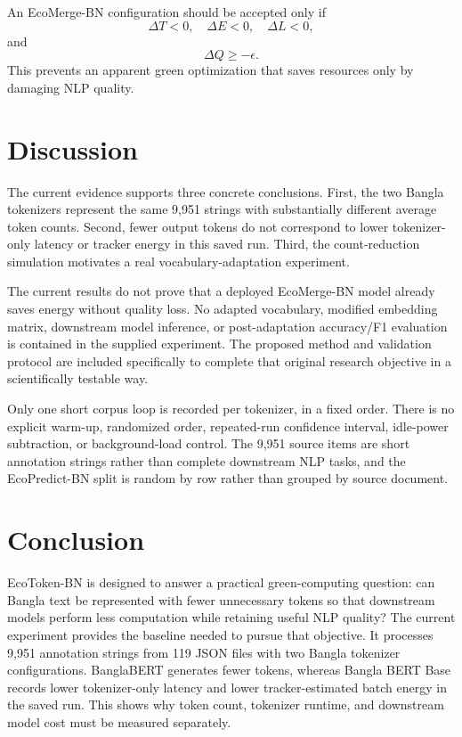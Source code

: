 \documentclass[conference]{IEEEtran}
\begin{document}
An EcoMerge-BN configuration should be accepted only if
\begin{equation}
\Delta T<0,\quad \Delta E<0,\quad \Delta L<0,
\end{equation}
and
\begin{equation}
\Delta Q\geq-\epsilon.
\end{equation}
This prevents an apparent green optimization that saves resources only by damaging NLP quality.

\section{Discussion}
The current evidence supports three concrete conclusions. First, the two Bangla tokenizers represent the same 9,951 strings with substantially different average token counts. Second, fewer output tokens do not correspond to lower tokenizer-only latency or tracker energy in this saved run. Third, the count-reduction simulation motivates a real vocabulary-adaptation experiment.

The current results do not prove that a deployed EcoMerge-BN model already saves energy without quality loss. No adapted vocabulary, modified embedding matrix, downstream model inference, or post-adaptation accuracy/F1 evaluation is contained in the supplied experiment. The proposed method and validation protocol are included specifically to complete that original research objective in a scientifically testable way.

Only one short corpus loop is recorded per tokenizer, in a fixed order. There is no explicit warm-up, randomized order, repeated-run confidence interval, idle-power subtraction, or background-load control. The 9,951 source items are short annotation strings rather than complete downstream NLP tasks, and the EcoPredict-BN split is random by row rather than grouped by source document.

\section{Conclusion}
EcoToken-BN is designed to answer a practical green-computing question: can Bangla text be represented with fewer unnecessary tokens so that downstream models perform less computation while retaining useful NLP quality? The current experiment provides the baseline needed to pursue that objective. It processes 9,951 annotation strings from 119 JSON files with two Bangla tokenizer configurations. BanglaBERT generates fewer tokens, whereas Bangla BERT Base records lower tokenizer-only latency and lower tracker-estimated batch energy in the saved run. This shows why token count, tokenizer runtime, and downstream model cost must be measured separately.
\end{document}
